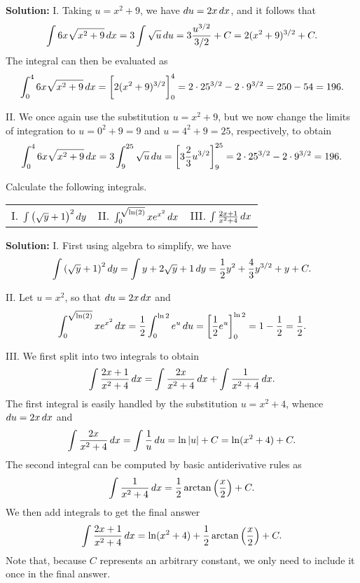 \documentclass[handout,hints]{ximera}
\begin{document}
\textbf{Solution:} I. Taking $u=x^2 + 9$, we have $\mathop{}\!d u = 2 x \mathop{}\!d x$, and it follows that
$$
\int  6x\sqrt{x^2+9} \mathop{}\!d x = 3 \int \sqrt{u} \mathop{}\!d u = 3 \frac{u^{3/2}}{3/2} + C = 2 (x^2 + 9)^{3/2} + C. 
$$
The integral can then be evaluated as 
$$
\int_0^4  6x\sqrt{x^2+9} \mathop{}\!d x = \bigg[ 2 (x^2 + 9)^{3/2} \bigg]_0^4 = 2 \cdot 25^{3/2} - 2 \cdot 9^{3/2} = 250 - 54 = 196.
$$

II. We once again use the substitution $u=x^2 + 9$, but we now change the limits of integration to $u=0^2+9=9$ and $u=4^2+9 = 25$, respectively, to obtain
$$
\int_0^4  6x\sqrt{x^2+9} \mathop{}\!d x = 3 \int_9^{25} \sqrt{u} \mathop{}\!d u = \bigg[ 3 \frac{2}{3} u^{3/2} \bigg]_9^{25} = 2 \cdot 25^{3/2} - 2 \cdot 9^{3/2} = 196.
$$

\begin{problem}
Calculate the following integrals.

\begin{tabular}{lll}
I.  $\int \left(\sqrt{y}+1\right)^2 \mathop{}\!d y$ \hspace{.5in} & II. $\int_0^{\sqrt{\ln(2)}} x e^{x^2} \mathop{}\!d x$ \hspace{.5in} & III. $\int \frac{2x+1}{x^2+4} \mathop{}\!d x$ \hspace{.05in}
\end{tabular}

\end{problem}

\textbf{Solution:} I. First using algebra to simplify, we have
$$
\int \left(\sqrt{y}+1\right)^2 \mathop{}\!d y = \int y + 2 \sqrt{y} + 1 \mathop{}\!d y = \frac{1}{2}y^2 + \frac{4}{3} y^{3/2} + y + C.
$$

II. Let $u = x^2$, so that $\mathop{}\!d u = 2 x \mathop{}\!d x$ and 
$$
\int_0^{\sqrt{\ln(2)}} x e^{x^2} \mathop{}\!d x = \frac{1}{2} \int_0 ^{\ln 2} e^u \mathop{}\!d u = \bigg[ \frac{1}{2} e^u \bigg]_0^{\ln 2} = 1- \frac{1}{2} = \frac{1}{2}.
$$

III. We first split into two integrals to obtain 
$$
\int \frac{2x+1}{x^2+4} \mathop{}\!d x = \int \frac{2x}{x^2 + 4} \mathop{}\!d x + \int \frac{1}{x^2 + 4} \mathop{}\!d x.
$$
The first integral is easily handled by the substitution $u = x^2 + 4$, whence $\mathop{}\!d u = 2 x \mathop{}\!d x$ and 
$$
\int \frac{2x}{x^2 + 4} \mathop{}\!d x = \int \frac{1}{u} \mathop{}\!d u = \ln |u| + C = \ln (x^2 + 4) + C.
$$
The second integral can be computed by basic antiderivative rules as 
$$
\int \frac{1}{x^2 + 4} \mathop{}\!d x = \frac{1}{2} \arctan \left(\frac{x}{2}\right) + C.
$$
We then add integrals to get the final answer
$$
\int \frac{2x+1}{x^2+4} \mathop{}\!d x = \ln (x^2 + 4) + \frac{1}{2} \arctan \left(\frac{x}{2}\right) + C.
$$
Note that, because $C$ represents an arbitrary constant, we only need to include it once in the final answer.
\end{document}

